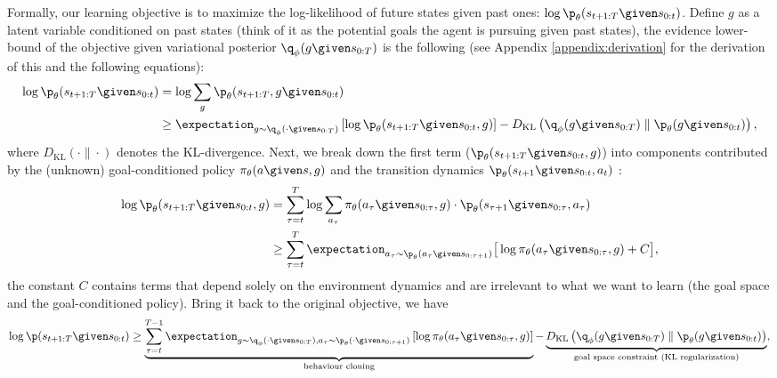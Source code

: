 \documentclass[11pt, a4paper, logo, one column]{craftjarvis}
\begin{document}
Formally, our learning objective is to maximize the log-likelihood of future states given past ones: $\log \p_\theta (s_{t+1:T} \given s_{0:t})$. Define $g$ as a latent variable conditioned on past states (think of it as the potential goals the agent is pursuing given past states), the evidence lower-bound of the objective given variational posterior $\q_\phi (g \given s_{0:T})$ is the following (see Appendix \ref{appendix:derivation} for the derivation of this and the following equations):
    \begin{align*}
        \log \p_\theta (s_{t+1:T} \given s_{0:t}) & = \log \sum_{g} \p_\theta (s_{t+1:T}, g \given s_{0:t}) \\ 
        & \geq \expectation_{g \sim \q_\phi(\cdot \given s_{0:T})} \left [ \log \p_\theta (s_{t+1:T} \given s_{0:t}, g) \right ] - D_{\mathrm{KL}} \left ( \q_\phi(g \given s_{0:T}) \parallel \p_\theta(g \given s_{0:t}) \right ),
        \label{eq:seq-elbo}
    \end{align*}
\noindent where $D_{\mathrm{KL}} ( \cdot \| \cdot )$ denotes the KL-divergence. Next, we break down the first term (\ie $\p_\theta (s_{t+1:T} \given s_{0:t}, g)$) into components contributed by the (unknown) goal-conditioned policy $\pi_\theta (a \given s, g)$ and the transition dynamics $\p_\theta (s_{t+1} \given s_{0:t}, a_t)$ :
    \begin{align*}
        \log \p_\theta (s_{t+1:T} \given s_{0:t}, g) & = \sum_{\tau = t}^{T} \log \sum_{a_{\tau}} \pi_\theta ( a_{\tau} \given s_{0:\tau}, g) \cdot \p_\theta (s_{\tau+1} \given s_{0:\tau}, a_{\tau}) \\
        & \geq \sum_{\tau = t}^{T} \expectation_{a_{\tau} \sim \p_\theta (a_{\tau} \given s_{0:\tau+1})} \big [ \log \pi_\theta (a_{\tau} \given s_{0:\tau}, g) + C \big ],
    \end{align*}
 the constant $C$ contains terms that depend solely on the environment dynamics and are irrelevant to what we want to learn (\ie the goal space and the goal-conditioned policy). Bring it back to the original objective, we have
    \begin{align*}
        \log \p (s_{t+1:T} \given s_{0:t}) 
        \geq \underbrace{\sum_{\tau=t}^{T-1} \expectation_{g \sim \q_\phi (\cdot \given s_{0:T}), a_{\tau} \sim \p_\theta(\cdot \given s_{0:\tau+1})} \left [ \log \pi_\theta (a_{\tau} \given s_{0:\tau}, g) \right ]}_{\text{behaviour cloning}} - \underbrace{D_{\mathrm{KL}} \left ( \q_\phi(g \given s_{0:T}) \parallel \p_{\theta}(g \given s_{0:t}) \right )}_{\text{goal space constraint (KL regularization)}},
    \end{align*}
\end{document}
